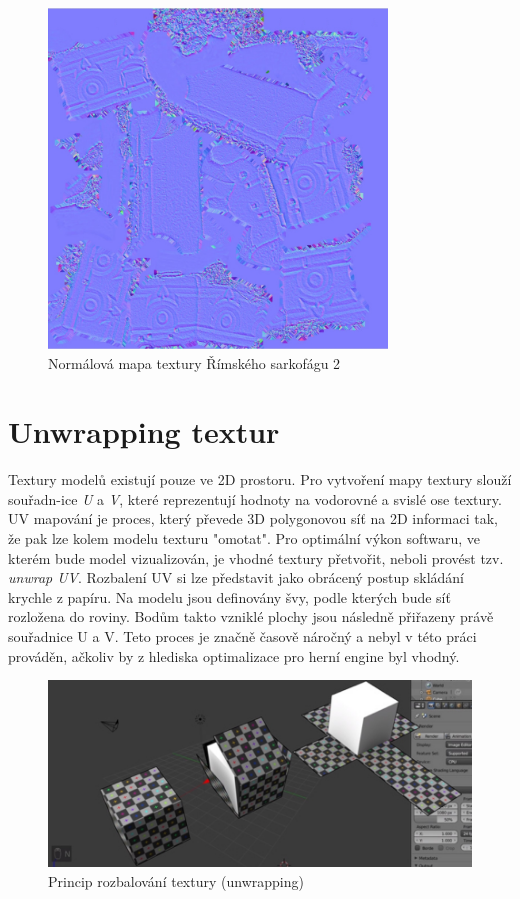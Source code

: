 \documentclass[a4paper, 12pt]{report}
\begin{document}
\begin{figure}[h!]
	\centering
	\includegraphics[width=9cm]{normal_maps.jpg}
	\caption{Normálová mapa textury Římského sarkofágu 2}
\end{figure}

\section{Unwrapping textur}
Textury modelů existují pouze ve 2D prostoru. Pro vytvoření mapy textury slouží souřadn-ice \textit{U} a \textit{V}, které reprezentují hodnoty na vodorovné a svislé ose textury. UV mapování je proces, který převede 3D polygonovou síť na 2D informaci tak, že pak lze kolem modelu texturu "omotat". Pro optimální výkon softwaru, ve kterém bude model vizualizován, je vhodné textury přetvořit, neboli provést tzv. \textit{unwrap UV}. Rozbalení UV si lze představit jako obrácený postup skládání krychle z papíru. Na modelu jsou definovány švy, podle kterých bude síť rozložena do roviny. Bodům takto vzniklé plochy jsou následně přiřazeny právě souřadnice U a V. Teto proces je značně časově náročný a nebyl v této práci prováděn, ačkoliv by z hlediska optimalizace pro herní engine byl vhodný. 

\begin{figure}[h!]
	\centering
	\includegraphics[width=14cm]{wrapping.jpg}
	\caption{Princip rozbalování textury (unwrapping)}
\end{figure}
\end{document}
